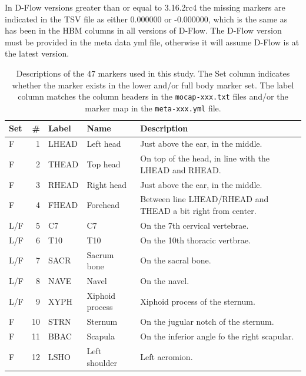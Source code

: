 \documentclass[10pt,a4paper,twocolumn]{article}
\begin{document}
In D-Flow versions greater than or equal to 3.16.2rc4 the missing markers are
indicated in the TSV file as either 0.000000 or -0.000000, which is the same as
has been in the HBM columns in all versions of D-Flow. The D-Flow version must
be provided in the meta data yml file, otherwise it will assume D-Flow is at
the latest version.

\begin{table}
  \cprotect\caption{Descriptions of the 47 markers used in this study. The Set
    column indicates whether the marker exists in the lower and/or full body
    marker set.  The label column matches the column headers in the
    \verb|mocap-xxx.txt| files and/or the marker map in the \verb|meta-xxx.yml|
    file.}
  \centering
  \small
  \begin{tabular}{lrlll}
    \toprule
    Set & \# & Label & Name & Description \\
    \midrule
    F   & 1  & LHEAD & Left head                             & Just above the ear, in the middle. \\
    F   & 2  & THEAD & Top head                              & On top of the head, in line with the LHEAD and RHEAD. \\
    F   & 3  & RHEAD & Right head                            & Just above the ear, in the middle. \\
    F   & 4  & FHEAD & Forehead                              & Between line LHEAD/RHEAD and THEAD a bit right from center. \\
    L/F & 5  & C7    & C7                                    & On the 7th cervical vertebrae. \\
    L/F & 6  & T10   & T10                                   & On the 10th thoracic vertbrae. \\
    L/F & 7  & SACR  & Sacrum bone                           & On the sacral bone. \\
    L/F & 8  & NAVE  & Navel                                 & On the navel. \\
    L/F & 9  & XYPH  & Xiphoid process                       & Xiphoid process of the sternum. \\
    F   & 10 & STRN  & Sternum                               & On the jugular notch of the sternum. \\
    F   & 11 & BBAC  & Scapula                               & On the inferior angle fo the right scapular. \\
    F   & 12 & LSHO  & Left shoulder                         & Left acromion. \\

\end{tabular}
\end{table}
\end{document}

